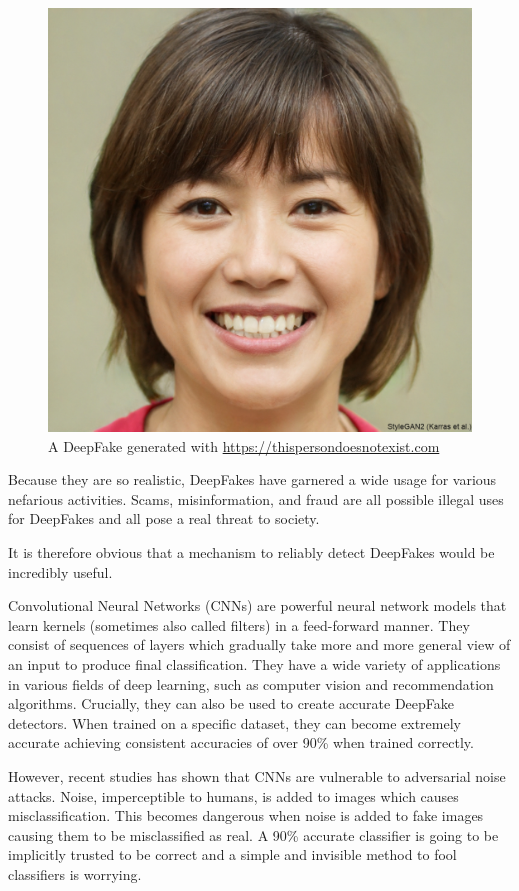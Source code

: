 \begin{figure}[h]
    \centering
    \includegraphics[width=0.5\linewidth]{dissertation//figures/thispersondoesnotexist.jpg}
    \caption{A DeepFake generated with \url{https://thispersondoesnotexist.com}}
    \label{fig:thispersondoesnotexist}
\end{figure}

Because they are so realistic, DeepFakes have garnered a wide usage for various nefarious activities. Scams, misinformation, and fraud are all possible illegal uses for DeepFakes and all pose a real threat to society\cite{sensity2024state}.

It is therefore obvious that a mechanism to reliably detect DeepFakes would be incredibly useful.

Convolutional Neural Networks (CNNs) are powerful neural network models that learn kernels (sometimes also called filters) in a feed-forward manner\cite{lecun2015deep}. They consist of sequences of layers which gradually take more and more general view of an input to produce final classification. They have a wide variety of applications in various fields of deep learning, such as computer vision and recommendation algorithms. Crucially, they can also be used to create accurate DeepFake detectors. When trained on a specific dataset, they can become extremely accurate achieving consistent accuracies of over 90\% when trained correctly\cite{papersiwthcodedeepfakedetection}.

However, recent studies has shown that CNNs are vulnerable to adversarial noise attacks. Noise, imperceptible to humans, is added to images which causes misclassification\cite{gandhi2020adversarial}. This becomes dangerous when noise is added to fake images causing them to be misclassified as real. A 90\% accurate classifier is going to be implicitly trusted to be correct and a simple and invisible method to fool classifiers is worrying.

